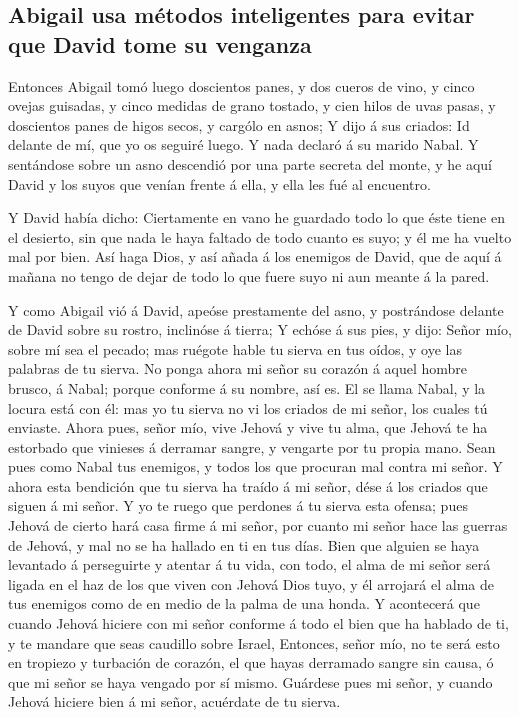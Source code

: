 \hypertarget{abigail-usa-muxe9todos-inteligentes-para-evitar-que-david-tome-su-venganza}{%
\subsection{Abigail usa métodos inteligentes para evitar que David tome
su
venganza}\label{abigail-usa-muxe9todos-inteligentes-para-evitar-que-david-tome-su-venganza}}

 Entonces Abigail tomó luego doscientos panes, y dos cueros
de vino, y cinco ovejas guisadas, y cinco medidas de grano tostado, y
cien hilos de uvas pasas, y doscientos panes de higos secos, y cargólo
en asnos;  Y dijo á sus criados: Id delante de mí, que yo
os seguiré luego. Y nada declaró á su marido Nabal.  Y
sentándose sobre un asno descendió por una parte secreta del monte, y he
aquí David y los suyos que venían frente á ella, y ella les fué al
encuentro.

 Y David había dicho: Ciertamente en vano he guardado todo
lo que éste tiene en el desierto, sin que nada le haya faltado de todo
cuanto es suyo; y él me ha vuelto mal por bien.  Así haga
Dios, y así añada á los enemigos de David, que de aquí á mañana no tengo
de dejar de todo lo que fuere suyo ni aun meante á la pared.

 Y como Abigail vió á David, apeóse prestamente del asno, y
postrándose delante de David sobre su rostro, inclinóse á tierra;
 Y echóse á sus pies, y dijo: Señor mío, sobre mí sea el
pecado; mas ruégote hable tu sierva en tus oídos, y oye las palabras de
tu sierva.  No ponga ahora mi señor su corazón á aquel
hombre brusco, á Nabal; porque conforme á su nombre, así es. El se llama
Nabal, y la locura está con él: mas yo tu sierva no vi los criados de mi
señor, los cuales tú enviaste.  Ahora pues, señor mío, vive
Jehová y vive tu alma, que Jehová te ha estorbado que vinieses á
derramar sangre, y vengarte por tu propia mano. Sean pues como Nabal tus
enemigos, y todos los que procuran mal contra mi señor.  Y
ahora esta bendición que tu sierva ha traído á mi señor, dése á los
criados que siguen á mi señor.  Y yo te ruego que perdones
á tu sierva esta ofensa; pues Jehová de cierto hará casa firme á mi
señor, por cuanto mi señor hace las guerras de Jehová, y mal no se ha
hallado en ti en tus días.  Bien que alguien se haya
levantado á perseguirte y atentar á tu vida, con todo, el alma de mi
señor será ligada en el haz de los que viven con Jehová Dios tuyo, y él
arrojará el alma de tus enemigos como de en medio de la palma de una
honda.  Y acontecerá que cuando Jehová hiciere con mi señor
conforme á todo el bien que ha hablado de ti, y te mandare que seas
caudillo sobre Israel,  Entonces, señor mío, no te será
esto en tropiezo y turbación de corazón, el que hayas derramado sangre
sin causa, ó que mi señor se haya vengado por sí mismo. Guárdese pues mi
señor, y cuando Jehová hiciere bien á mi señor, acuérdate de tu sierva.

